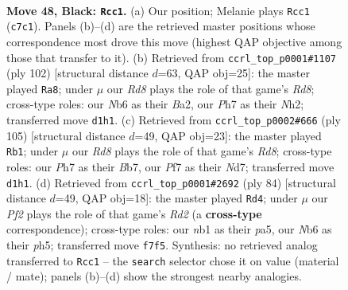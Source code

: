 \documentclass[11pt]{article}
\begin{document}
\clearpage

\begin{figure}[p]\centering
\begin{subfigure}{0.46\textwidth}\centering
\resizebox{\linewidth}{!}{%
\newchessgame
\chessboard[
  setfen={6k1/2r2p1p/1n4p1/p3p1P1/P3P3/1P4RP/4K1P1/RN1r4 b - - 11 48},
  showmover=false,
  pgfstyle=straightmove, color=movearrow, markmove={c7-c1}
]}
\caption{}
\end{subfigure}\hfill
\begin{subfigure}{0.46\textwidth}\centering
\resizebox{\linewidth}{!}{%
\newchessgame
\chessboard[
  setfen={3R4/3n1k1p/3r1p2/p2p2pP/1b1p2P1/3P4/B1P2P1N/6K1 w - - 17 52},
  showmover=false,
  pgfstyle=straightmove, color=movearrow, markmove={d8-a8}
]}
\caption{}
\end{subfigure}
\\[4pt]
\begin{subfigure}{0.46\textwidth}\centering
\resizebox{\linewidth}{!}{%
\newchessgame
\chessboard[
  setfen={8/1b1n2pk/5p1p/1p1p1P2/1PpP1RP1/8/4R2P/3rN2K b - - 3 53},
  showmover=false,
  pgfstyle=straightmove, color=movearrow, markmove={d1-b1}
]}
\caption{}
\end{subfigure}\hfill
\begin{subfigure}{0.46\textwidth}\centering
\resizebox{\linewidth}{!}{%
\newchessgame
\chessboard[
  setfen={8/8/r3k1p1/p1r2p1p/R1p2P2/2P1PKP1/3R4/8 w - - 21 43},
  showmover=false,
  pgfstyle=straightmove, color=movearrow, markmove={d2-d4}
]}
\caption{}
\end{subfigure}
\caption{\textbf{Move 48, Black: \texttt{Rcc1}.} (a) Our position; Melanie plays \texttt{Rcc1} (\texttt{c7c1}). Panels (b)--(d) are the retrieved master positions whose correspondence most drove this move (highest QAP objective among those that transfer to it). (b) Retrieved from \texttt{ccrl\_top\_p0001\#1107} (ply 102) [structural distance $d$=63, QAP obj=25]: the master played \texttt{Ra8}; under $\mu$ our \emph{Rd8} plays the role of that game's \emph{Rd8}; cross-type roles: our \emph{N}b6 as their \emph{B}a2, our \emph{P}h7 as their \emph{N}h2; transferred move \texttt{d1h1}. (c) Retrieved from \texttt{ccrl\_top\_p0002\#666} (ply 105) [structural distance $d$=49, QAP obj=23]: the master played \texttt{Rb1}; under $\mu$ our \emph{Rd8} plays the role of that game's \emph{Rd8}; cross-type roles: our \emph{P}h7 as their \emph{B}b7, our \emph{P}f7 as their \emph{N}d7; transferred move \texttt{d1h1}. (d) Retrieved from \texttt{ccrl\_top\_p0001\#2692} (ply 84) [structural distance $d$=49, QAP obj=18]: the master played \texttt{Rd4}; under $\mu$ our \emph{Pf2} plays the role of that game's \emph{Rd2} (a \textbf{cross-type} correspondence); cross-type roles: our \emph{n}b1 as their \emph{p}a5, our \emph{N}b6 as their \emph{p}h5; transferred move \texttt{f7f5}. Synthesis: no retrieved analog transferred to \texttt{Rcc1} -- the \texttt{search} selector chose it on value (material / mate); panels (b)--(d) show the strongest nearby analogies.}
\label{fig:thought-m95}
\end{figure}
\end{document}
